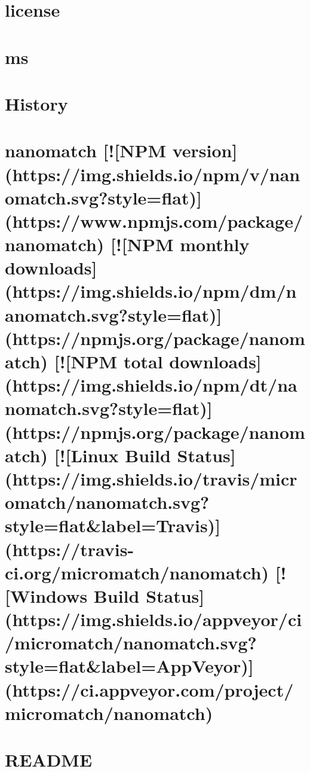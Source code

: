 \documentclass[twoside]{book}
\newcommand{\+}{\discretionary{\mbox{\scriptsize$\hookleftarrow$}}{}{}}
\begin{document}
\chapter{license}
\label{md_dsmacc_vis_degree_node_modules_ms_license}

\chapter{ms}
\label{md_dsmacc_vis_degree_node_modules_ms_readme}

\chapter{History}
\label{md_dsmacc_vis_degree_node_modules_nanomatch_CHANGELOG}

\chapter{nanomatch \mbox{[}!\mbox{[}N\+PM version\mbox{]}(https\+://img.shields.\+io/npm/v/nanomatch.svg?style=flat)\mbox{]}(https\+://www.npmjs.\+com/package/nanomatch) \mbox{[}!\mbox{[}N\+PM monthly downloads\mbox{]}(https\+://img.shields.\+io/npm/dm/nanomatch.svg?style=flat)\mbox{]}(https\+://npmjs.org/package/nanomatch) \mbox{[}!\mbox{[}N\+PM total downloads\mbox{]}(https\+://img.shields.\+io/npm/dt/nanomatch.svg?style=flat)\mbox{]}(https\+://npmjs.org/package/nanomatch) \mbox{[}!\mbox{[}Linux Build Status\mbox{]}(https\+://img.shields.\+io/travis/micromatch/nanomatch.svg?style=flat\&label=Travis)\mbox{]}(https\+://travis-\/ci.org/micromatch/nanomatch) \mbox{[}!\mbox{[}Windows Build Status\mbox{]}(https\+://img.shields.\+io/appveyor/ci/micromatch/nanomatch.svg?style=flat\&label=App\+Veyor)\mbox{]}(https\+://ci.appveyor.\+com/project/micromatch/nanomatch)}
\label{md_dsmacc_vis_degree_node_modules_nanomatch_README}

\chapter{R\+E\+A\+D\+ME}
\label{md_dsmacc_vis_degree_node_modules_nopt_README}

\end{document}
